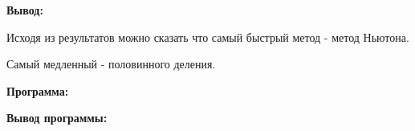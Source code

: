 \documentclass[]{article}
\begin{document}
\newpage
\begin{center}
	\huge\textbf{Вывод:}
\end{center}

Исходя из результатов можно сказать что самый быстрый метод - метод Ньютона.

Самый медленный - половинного деления.

\newpage
\begin{center}
	\huge\textbf{Программа:}
\end{center}



\newpage
\begin{center}
	\huge\textbf{Вывод программы:}
\end{center}


\end{document}
